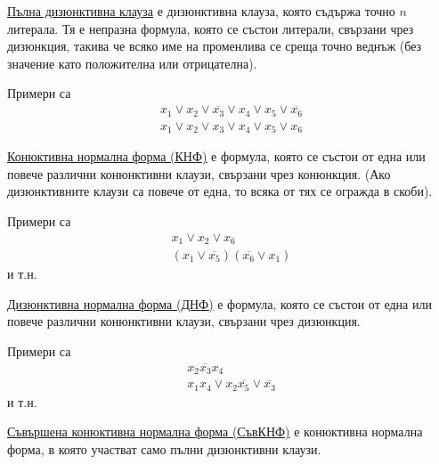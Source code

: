 \begin{definition}
    \underline{Пълна дизюнктивна клауза} е дизюнктивна клауза, която съдържа точно \(n\) литерала. Тя е 
    непразна формула, която се състои литерали, свързани чрез дизюнкция, такива че всяко име на променлива 
    се среща точно веднъж (без значение като положителна или отрицателна).
\end{definition}

\begin{example}
    Примери са
    \begin{align*}
        x_1 \vee x_2 \vee \overline{x_3} \vee x_4 \vee x_5 \vee \overline{x_6} \\
        x_1 \vee x_2 \vee x_3 \vee x_4 \vee x_5 \vee x_6
    \end{align*}
\end{example}

\begin{definition}
    \underline{Конюктивна нормална форма (КНФ)} е формула, която се състои от една или повече различни 
    конюнктивни клаузи, свързани чрез конюнкция. (Ако дизюнктивните клаузи са повече от една, то всяка 
    от тях се огражда в скоби).
\end{definition}

\begin{example}
    Примери са
    \begin{align*}
        x_1 \vee x_2 \vee x_6 \\
        (x_1 \vee \overline{x_5})(\overline{x_6} \vee x_1)
    \end{align*} и т.н.
\end{example}

\begin{definition}
    \underline{Дизюнктивна нормална форма (ДНФ)} е формула, която се състои от една или повече различни 
    конюнктивни клаузи, свързани чрез дизюнкция.
\end{definition}

\begin{example}
    Примери са
    \begin{align*}
        x_2\overline{x_3}x_4 \\
        x_1x_4 \vee x_2\overline{x_5} \vee \overline{x_3}
    \end{align*} и т.н.
\end{example}

\begin{definition}
    \underline{Съвършена конюктивна нормална форма (СъвКНФ)} е конюктивна нормална форма, в която 
    участват само пълни дизюнктивни клаузи.
\end{definition}

